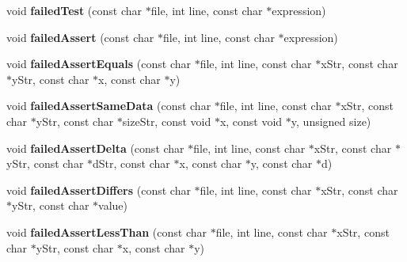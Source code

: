 \begin{DoxyCompactItemize}
\item 
\hypertarget{classCxxTest_1_1TestTracker_a19f9553adee94d370e75a6a828c6b903}{void {\bfseries failed\-Test} (const char $\ast$file, int line, const char $\ast$expression)}\label{classCxxTest_1_1TestTracker_a19f9553adee94d370e75a6a828c6b903}

\item 
\hypertarget{classCxxTest_1_1TestTracker_a0c33a9bc53ebd777326f992b042b94b0}{void {\bfseries failed\-Assert} (const char $\ast$file, int line, const char $\ast$expression)}\label{classCxxTest_1_1TestTracker_a0c33a9bc53ebd777326f992b042b94b0}

\item 
\hypertarget{classCxxTest_1_1TestTracker_a6e5a6163457adf5c95b058af6d76c308}{void {\bfseries failed\-Assert\-Equals} (const char $\ast$file, int line, const char $\ast$x\-Str, const char $\ast$y\-Str, const char $\ast$x, const char $\ast$y)}\label{classCxxTest_1_1TestTracker_a6e5a6163457adf5c95b058af6d76c308}

\item 
\hypertarget{classCxxTest_1_1TestTracker_a966cfbed91ee797d122451a233a91154}{void {\bfseries failed\-Assert\-Same\-Data} (const char $\ast$file, int line, const char $\ast$x\-Str, const char $\ast$y\-Str, const char $\ast$size\-Str, const void $\ast$x, const void $\ast$y, unsigned size)}\label{classCxxTest_1_1TestTracker_a966cfbed91ee797d122451a233a91154}

\item 
\hypertarget{classCxxTest_1_1TestTracker_a726319a34a4aa76a23a9110ddb4c6a3f}{void {\bfseries failed\-Assert\-Delta} (const char $\ast$file, int line, const char $\ast$x\-Str, const char $\ast$y\-Str, const char $\ast$d\-Str, const char $\ast$x, const char $\ast$y, const char $\ast$d)}\label{classCxxTest_1_1TestTracker_a726319a34a4aa76a23a9110ddb4c6a3f}

\item 
\hypertarget{classCxxTest_1_1TestTracker_ad5ddce9a206a2d5107acbb9f34869e66}{void {\bfseries failed\-Assert\-Differs} (const char $\ast$file, int line, const char $\ast$x\-Str, const char $\ast$y\-Str, const char $\ast$value)}\label{classCxxTest_1_1TestTracker_ad5ddce9a206a2d5107acbb9f34869e66}

\item 
\hypertarget{classCxxTest_1_1TestTracker_af22597e16b15b7e245bae85b918dd105}{void {\bfseries failed\-Assert\-Less\-Than} (const char $\ast$file, int line, const char $\ast$x\-Str, const char $\ast$y\-Str, const char $\ast$x, const char $\ast$y)}\label{classCxxTest_1_1TestTracker_af22597e16b15b7e245bae85b918dd105}


\end{DoxyCompactItemize}

